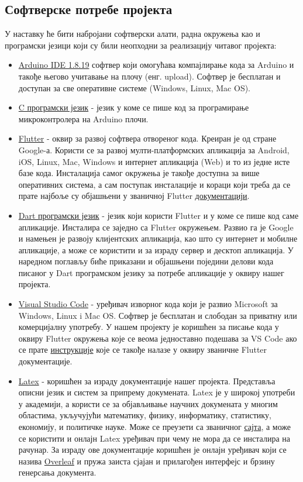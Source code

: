 \documentclass[12pt]{article}
\begin{document}
\subsection{Софтверске потребе пројекта}
У наставку ће бити набројани софтверски алати, радна окружења као и програмски језици који су били неопходни за реализацију читавог пројекта:
\begin{itemize}
  \item \href{https://www.arduino.cc/en/software}{Arduino IDE 1.8.19} софтвер који омогућава компајлирање кода за Arduino и такође његово учитавање на плочу (енг. upload). Софтвер је бесплатан и доступан за све оперативне системе (Windows, Linux, Mac OS).
  \item \href{https://en.wikipedia.org/wiki/C_(programming_language)}{C програмски језик} - језик у коме се пише код за програмирање микроконтролера на Arduino плочи.
  \item \href{https://en.wikipedia.org/wiki/Flutter\_(software)}{Flutter} - оквир за развој софтвера отвореног кода. Креиран је од стране Google-а. Користи се за развој мулти-платформских апликација за Android, iOS, Linux, Mac, Windows и интернет апликација (Web) и то из једне исте базе кода. Инсталација самог окружења је такође доступна за више оперативних система, а сам поступак инсталације и кораци који треба да се прате најбоље су објашњени у званичној Flutter \href{https://docs.flutter.dev/get-started/install}{документацији}.
  \item \href{https://en.wikipedia.org/wiki/Dart\_(programming\_language)}{Dart програмски језик} - језик који користи Flutter и у коме се пише код саме апликације. Инсталира се заједно са Flutter окружењем. Развио га је Google и намењен је развоју клијентских апликација, као што су интернет и мобилне апликације, а може се користити и за израду сервер и десктоп апликација. У наредном поглављу биће приказани и објашњени поједини делови кода писаног у Dart програмском језику за потребе апликације у оквиру нашег пројекта.
  \item \href{https://code.visualstudio.com/}{Visual Studio Code} - уређивач изворног кода који је развио Microsoft за Windows, Linux i Mac OS. Софтвер је бесплатан и слободан за приватну или комерцијалну употребу. У нашем пројекту је коришћен за писање кода у оквиру Flutter окружења које се веома једноставно подешава за VS Code ако се прате \href{https://docs.flutter.dev/get-started/editor?tab=vscode}{инструкције} које се такође налазе у оквиру званичне Flutter документације.
  \item \href{https://en.wikipedia.org/wiki/LaTeX}{Latex} - коришћен за израду документације нашег пројекта. Представља описни језик и систем за припрему докумената. Latex је у широкој употреби у академији, а користи се за објављивање научних докумената у многим областима, укључујући математику, физику, информатику, статистику, економију, и политичке науке. Може се преузети са званичног \href{https://www.latex-project.org/get/}{сајта}, а може се користити и онлајн Latex уређивач при чему не мора да се инсталира на рачунар. За израду ове документације коришћен је онлајн уређивач који се назива \href{https://www.overleaf.com/project}{Overleaf} и пружа заиста сјајан и прилагођен интерфејс и брзину генерсања документа.

\end{itemize}
\end{document}
